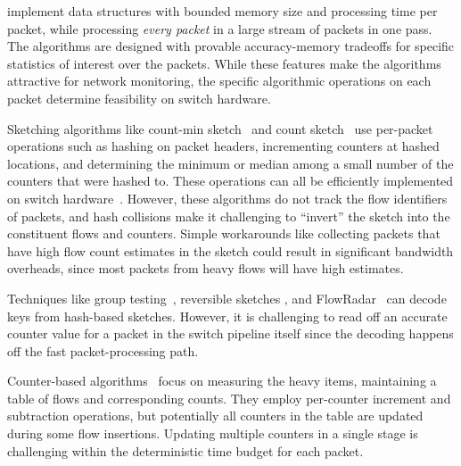  implement data structures with bounded memory size
and processing time per packet, while processing {\em every packet} in a large
stream of packets in one pass. The algorithms are designed with provable
accuracy-memory tradeoffs for specific statistics of interest over the
packets. While these features make the algorithms attractive for network
monitoring, the specific algorithmic operations on each packet determine
feasibility on switch hardware.

Sketching algorithms like count-min sketch~\cite{cormode2005improved} and count
sketch~\cite{charikar2002finding} use per-packet operations such as hashing on
packet headers, incrementing counters at hashed locations, and determining the
minimum or median among a small number of the counters that were hashed
to. These operations can all be efficiently implemented on switch
hardware~\cite{yu2013software}.
%
However, these algorithms do not track the flow identifiers of packets, and hash
collisions make it challenging to ``invert'' the sketch into the constituent
flows and counters.
%
Simple workarounds like collecting packets that have high flow count estimates
in the sketch could result in significant bandwidth overheads, since most
packets from heavy flows will have high estimates.
%

Techniques like group testing~\cite{group-testing}, reversible sketches
\cite{schweller2004reversible}, and FlowRadar~\cite{li2016flowradar} can decode
keys from hash-based sketches. 
%
However, it is challenging to read off an accurate counter value for a packet in
the switch pipeline itself since the decoding happens off the fast packet-processing
path.
%
%

Counter-based algorithms~\cite{misra1982finding,manku2002approximate} focus on measuring the heavy
items, maintaining a table of flows and corresponding counts. They employ
per-counter increment and subtraction operations, but potentially all counters
in the table are updated during some flow insertions.
Updating multiple counters in a single stage is challenging within the deterministic time budget for each packet.

